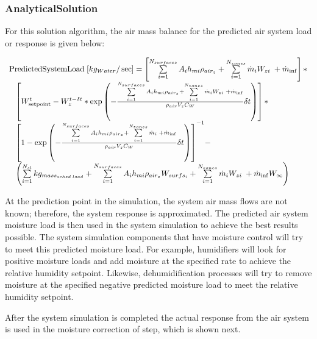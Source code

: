 \subsubsection{AnalyticalSolution}\label{analyticalsolution-001}

For this solution algorithm, the air mass balance for the predicted air system load or response is given below:

\begin{equation}
\begin{array}{l}{\rm{PredictedSystemLoad}}\;[k{g_{Water}}/\sec ] = \left[ {\sum\limits_{i = 1}^{{N_{surfaces}}} {{A_i}{h_{mi}}} {\rho_{ai{r_z}}} + \sum\limits_{i = 1}^{{N_{zones}}} {{{\dot m}_i}} {W_{zi}}\; + {{\dot m}_{\inf }}} \right]*\\\;\;\;\left[ {W_{{\rm{setpoint}}}^t - W_z^{t - \delta t}*\exp \left( { - \frac{{\sum\limits_{i = 1}^{{N_{surfaces}}} {{A_i}{h_{mi}}} {\rho_{ai{r_z}}} + \sum\limits_{i = 1}^{{N_{zones}}} {{{\dot m}_i}} {W_{zi}}\; + {{\dot m}_{\inf }}}}{{{\rho_{air}}{V_z}{C_W}}}\delta t} \right)} \right]*\\\;\;\;{\left[ {1 - \exp \left( { - \frac{{\sum\limits_{i = 1}^{{N_{surfaces}}} {{A_i}{h_{mi}}} {\rho_{ai{r_z}}} + \sum\limits_{i = 1}^{{N_{zones}}} {{{\dot m}_i}} \; + {{\dot m}_{\inf }}}}{{{\rho_{air}}{V_z}{C_W}}}\delta t} \right)} \right]^{ - 1}} - \\\;\;\;\left( {\sum\limits_{i = 1}^{{N_{sl}}} {k{g_{mas{s_{sched\;load}}}}} + \sum\limits_{i = 1}^{{N_{surfaces}}} {{A_i}{h_{mi}}} {\rho_{ai{r_z}}}{W_{surf{s_i}}} + \sum\limits_{i = 1}^{{N_{zones}}} {{{\dot m}_i}} {W_{zi}}\; + {{\dot m}_{\inf }}{W_\infty }} \right)\end{array}
\end{equation}

At the prediction point in the simulation, the system air mass flows are not known; therefore, the system response is approximated. The predicted air system moisture load is then used in the system simulation to achieve the best results possible. The system simulation components that have moisture control will try to meet this predicted moisture load. For example, humidifiers will look for positive moisture loads and add moisture at the specified rate to achieve the relative humidity setpoint. Likewise, dehumidification processes will try to remove moisture at the specified negative predicted moisture load to meet the relative humidity setpoint.

After the system simulation is completed the actual response from the air system is used in the moisture correction of step, which is shown next.

